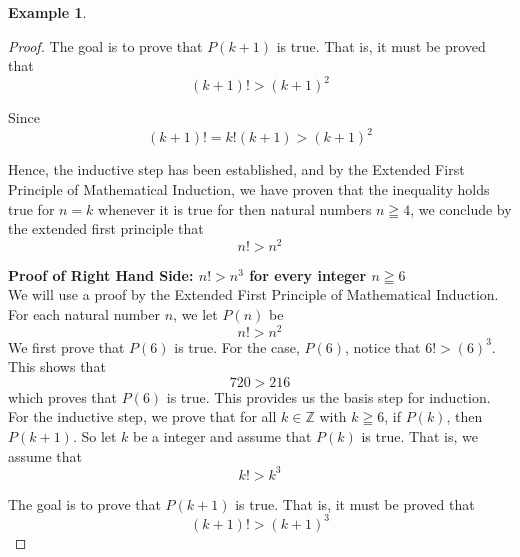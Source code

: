 \documentclass{book}
\theoremstyle{definition}
\newtheorem{example}{Example}[definition]
\theoremstyle{remark}
\newcommand{\bb}[1]{\mathbb{#1}}
\begin{document}
\begin{example}
\begin{proof}
            The goal is to prove that $P(k+1)$ is true. That is, it must be proved that  
                \begin{equation}
                    (k+1)! > (k+1)^2 
                \end{equation}
            
           Since
                \begin{equation}
                    (k+1)! = k!(k+1) > (k+1)^2 
                \end{equation}
            
            Hence, the inductive step has been established, and by the Extended First Principle of Mathematical Induction, we have proven that the inequality holds true for $n=k$ whenever it is true for then natural numbers $n \geqq 4$, we conclude by the extended first principle that
                \begin{equation*}
                    n! > n^2
                \end{equation*}
    
    \textbf{Proof of Right Hand Side: $n! > n^3$ for every integer $n \geqq 6$} \\
            We will use a proof by the Extended First Principle of Mathematical Induction. For each natural number $n$, we let $P(n)$ be
                \begin{equation*}
                    n! > n^2
                \end{equation*}
            We first prove that $P(6)$ is true. For the case, $P(6)$, notice that $6! > (6)^3$. This shows that   
                \begin{equation*}
                    720 > 216
                \end{equation*}
            which proves that $P(6)$ is true. This provides us the basis step for induction. \\ 
            
            For the inductive step, we prove that for all $k \in \bb{Z}$ with $k \geqq 6$, if $P(k)$, then $P(k+1)$. So let $k$ be a integer and assume that $P(k)$ is true. That is, we assume that 
                \begin{equation*}
                   k! > k^3
                \end{equation*}
            
            The goal is to prove that $P(k+1)$ is true. That is, it must be proved that  
                \begin{equation}
                    (k+1)! > (k+1)^3 
                \end{equation}
            

\end{proof}
\end{example}
\end{document}
